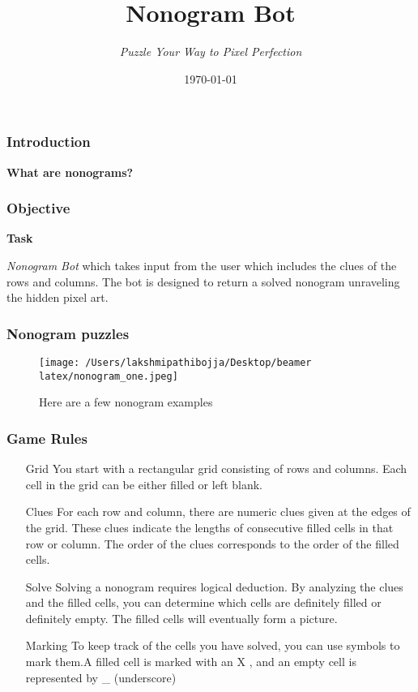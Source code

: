 \documentclass[14pt  aspectratio = 169]{beamer}
\title{ Nonogram Bot }
\subtitle { \textit {Puzzle Your Way to Pixel Perfection}}
\date {\today}
\begin{document}
\begin{frame}
  \titlepage
\end{frame}

\begin{frame} 
   \frametitle {Introduction}
       \begin{center}
           \textbf{What are nonograms?}  
       \end{center}
\end{frame}

\begin{frame}       
\frametitle{Objective}
 \begin{center}
       \textbf {Task}
\end{center}
         \emph{Nonogram Bot} {which takes input from the user which includes the clues of the rows and columns. The bot is designed to return a solved nonogram unraveling the hidden pixel art.}
\end{frame}       


\begin{frame}
    \frametitle {Nonogram puzzles}
     \begin{figure}
    \texttt{[image: /Users/lakshmipathibojja/Desktop/beamer latex/nonogram\_one.jpeg]}
    \caption{Here are a few nonogram examples}
  \end{figure}
\end{frame}


\begin{frame}
    \frametitle {Game Rules}
        \begin{itemize}
           \item [Grid]{You start with a rectangular grid consisting of rows and columns. Each cell in the grid can be either filled or left blank.}
           \item [Clues] {For each row and column, there are numeric clues given at the edges of the grid. These clues indicate the lengths of consecutive filled cells in that row or column. The order of the clues corresponds to the order of the filled cells.}
           \item [Solve]{Solving a nonogram requires logical deduction. By analyzing the clues and the filled cells, you can determine which cells are definitely filled or definitely empty. The filled cells will eventually form a picture.}
           \item [Marking]{ To keep track of the cells you have solved, you can use symbols to mark them.A filled cell is marked with an X , and an empty cell is represented by \_ (underscore)}
       \end{itemize}
\end{frame}
\end{document}
